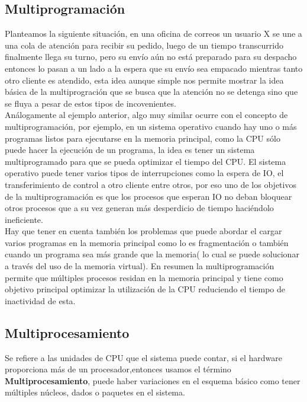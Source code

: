 \documentclass[conference,letterpaper]{IEEEtran}
\begin{document}
\subsection{Multiprogramaci\'on}
Planteamos la siguiente situación, en una oficina de correos un usuario X se une a una cola de atención para recibir su pedido, luego de un tiempo transcurrido finalmente llega su turno, pero su envío aún no está preparado para su despacho entonces lo pasan a un lado a la espera que su envío sea empacado mientras tanto otro cliente es atendido, esta idea aunque simple nos permite mostrar  la idea básica de la multiprogración que se busca que la atención no se detenga sino que se fluya a pesar de estos tipos de incovenientes.\\

An\'{a}logamente al ejemplo anterior, algo muy similar ocurre con  el  concepto  de  multiprogramaci\'{o}n,  por  ejemplo,  en  un sistema  operativo  cuando  hay  uno  o  m\'{a}s  programas  listos para  ejecutarse  en  la  memoria  principal,  como  la  CPU  s\'{o}lo puede  hacer  la  ejecuci\'{o}n  de  un  programa,  la  idea  es  tener un  sistema  multiprogramado  para  que  se  pueda  optimizar  el tiempo del CPU. El sistema operativo puede tener varios tipos de  interrupciones  como  la  espera  de  IO,  el  transferimiento de  control  a  otro  cliente  entre  otros,  por  eso  uno  de  los objetivos   de   la   multiprogramaci\'{o}n   es   que   los   procesos que  esperan  IO  no  deban  bloquear  otros  procesos  que  a  su vez generan m\'{a}s desperdicio de tiempo haci\'{e}ndolo ineficiente.\\

Hay que tener en cuenta tambi\'{e}n los problemas que puede abordar  el  cargar  varios programas  en  la  memoria  principal como  lo  es  fragmentaci\'{o}n  o  tambi\'{e}n  cuando  un  programa sea m\'{a}s grande que la memoria( lo cual se puede solucionar a  trav\'{e}s  del  uso  de  la  memoria  virtual).  En  resumen  la multiprogramaci\'{o}n  permite  que  m\'{u}ltiples  procesos  residan en  la  memoria  principal  y  tiene  como  objetivo  principal optimizar  la  utilizaci\'{o}n  de  la  CPU  reduciendo  el  tiempo  de inactividad de esta.\\

\subsection{Multiprocesamiento}
Se  refiere a las  unidades de CPU que el sistema puede contar,  si el hardware proporciona m\'{a}s  de  un  procesador,entonces  usamos  el  t\'{e}rmino \textbf{Multiprocesamiento},  puede  haber  variaciones  en  el  esquema  b\'{a}sico  como  tener  m\'{u}ltiples n\'{u}cleos, dados o paquetes en el sistema.
\end{document}
